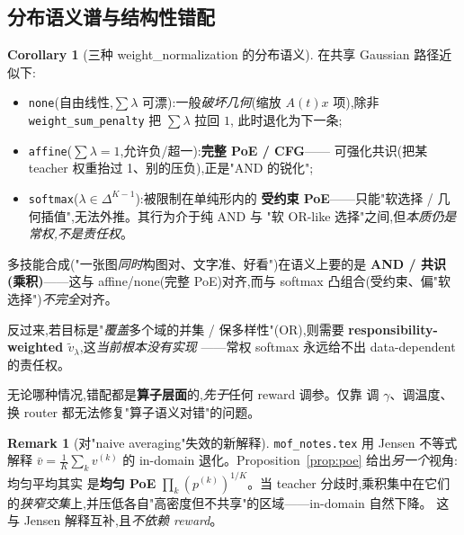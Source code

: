 \documentclass[11pt,a4paper]{article}
\theoremstyle{definition}
\newtheorem{remark}{Remark}
\newtheorem{corollary}{Corollary}
\begin{document}
\subsection{分布语义谱与结构性错配}
\label{ssec:spectrum}

\begin{corollary}[三种 weight\_normalization 的分布语义]
\label{cor:spectrum}
在共享 Gaussian 路径近似下:
\begin{itemize}[leftmargin=1.5em]
\item \texttt{none}(自由线性,$\sum\lambda$ 可漂):一般\emph{破坏几何}(缩放
$A(t)x$ 项),除非 \texttt{weight\_sum\_penalty} 把 $\sum\lambda$ 拉回 $1$,
此时退化为下一条;
\item \texttt{affine}($\sum\lambda=1$,允许负/超一):\textbf{完整 PoE / CFG}——
可强化共识(把某 teacher 权重抬过 1、别的压负),正是"AND 的锐化";
\item \texttt{softmax}($\lambda\in\Delta^{K-1}$):被限制在单纯形内的
\textbf{受约束 PoE}——只能"软选择 / 几何插值",无法外推。其行为介于纯 AND 与
"软 OR-like 选择"之间,但\emph{本质仍是常权,不是责任权}。
\end{itemize}
\end{corollary}

\begin{tcolorbox}[colback=orange!5,colframe=orange!60!black,title=\textbf{与 reward 无关的结构性错配}]
多技能合成("一张图\emph{同时}构图对、文字准、好看")在语义上要的是
\textbf{AND / 共识(乘积)}——这与 affine/none(完整 PoE)对齐,而与 softmax
凸组合(受约束、偏"软选择")\emph{不完全}对齐。

反过来,若目标是"\emph{覆盖}多个域的并集 / 保多样性"(OR),则需要
\textbf{responsibility-weighted $\tilde v_\lambda$},这\emph{当前根本没有实现}
——常权 softmax 永远给不出 data-dependent 的责任权。

无论哪种情况,错配都是\textbf{算子层面}的,\emph{先于}任何 reward 调参。仅靠
调 $\gamma$、调温度、换 router 都无法修复"算子语义对错"的问题。
\end{tcolorbox}

\begin{remark}[对"naive averaging"失效的新解释]
\texttt{mof\_notes.tex} 用 Jensen 不等式解释 $\bar v=\frac1K\sum_k v^{(k)}$ 的
in-domain 退化。Proposition~\ref{prop:poe} 给出\emph{另一个}视角:均匀平均其实
是\textbf{均匀 PoE} $\prod_k (p^{(k)})^{1/K}$。当 teacher 分歧时,乘积集中在它们
的\emph{狭窄交集}上,并压低各自"高密度但不共享"的区域——in-domain 自然下降。
这与 Jensen 解释互补,且\emph{不依赖 reward}。
\end{remark}
\end{document}
